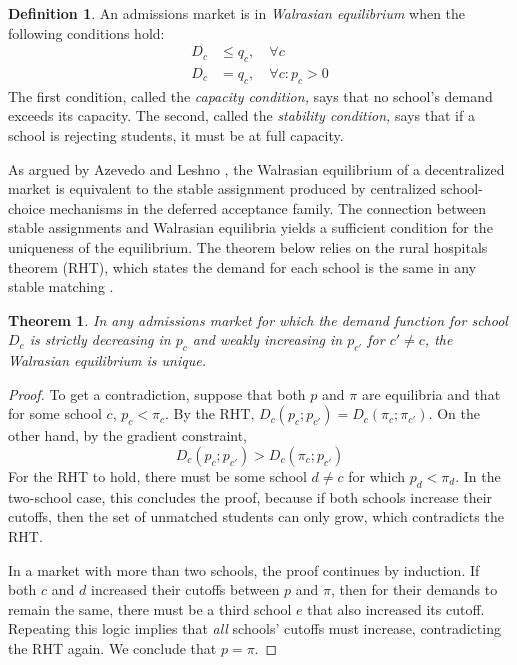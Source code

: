 \documentclass[12pt]{article}
\numberwithin{equation}{subsection}
\newtheorem{theorem}{Theorem}
\theoremstyle{definition}
\newtheorem{definition}{Definition}
\begin{document}
\begin{definition} \label{marketeqconditions} An admissions market is in \emph{Walrasian equilibrium} when the following conditions hold:
\begin{align} D_c &\leq q_c, \quad \forall c \label{capacitycondition} \\
D_c &= q_c, \quad \forall c: p_c > 0 \label{stabilitycondition}
\end{align}
The first condition, called the \emph{capacity condition,} says that no school's demand exceeds its capacity. The second, called the \emph{stability condition,} says that if a school is rejecting students, it must be at full capacity.
\end{definition}

As argued by Azevedo and Leshno \parencite*{supplydemandfw}, the Walrasian equilibrium of a decentralized market is equivalent to the stable assignment produced by centralized school-choice mechanisms in the deferred acceptance family.%
The connection between stable assignments and Walrasian equilibria yields a sufficient condition for the uniqueness of the equilibrium. The theorem below relies on the rural hospitals theorem (RHT), which states the demand for each school is the same in any stable matching \parencite[][]{ruralhospitalstheorem}.

\begin{theorem} \label{equilibriumuniquenesstheorem}
In any admissions market for which the demand function for school $D_c$ is strictly decreasing in $p_c$ and weakly increasing in $p_{c'}$ for $c' \neq c$, the Walrasian equilibrium is unique.
\end{theorem} 

\begin{proof}
To get a contradiction, suppose that both $p$ and $\pi$ are equilibria and that for some school $c$, $p_c < \pi_c$. By the RHT, $D_c(p_c; p_{c'}) = D_c(\pi_c; \pi_{c'})$. On the other hand, by the gradient constraint,\[D_c(p_c; p_{c'}) > D_c(\pi_c; p_{c'})\]
For the RHT to hold, there must be some school $d \neq c$ for which $p_d < \pi_d$. In the two-school case, this concludes the proof, because if both schools increase their cutoffs, then the set of unmatched students can only grow, which contradicts the RHT.

In a market with more than two schools, the proof continues by induction. If both $c$ and $d$ increased their cutoffs between $p$ and $\pi$, then for their demands to remain the same, there must be a third school $e$ that also increased its cutoff. Repeating this logic implies that \emph{all} schools' cutoffs must increase, contradicting the RHT again. We conclude that $p = \pi$.
\end{proof}
\end{document}
